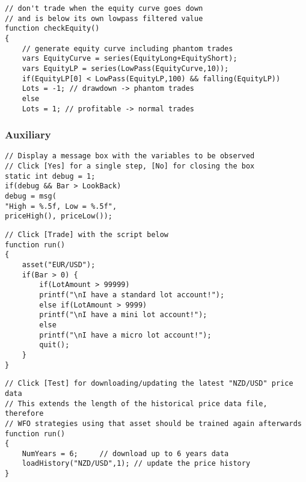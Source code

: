 \begin{lstlisting}[caption=Equity curve trading (skipping trades dependent on strategy success)]
// don't trade when the equity curve goes down
// and is below its own lowpass filtered value
function checkEquity()
{
	// generate equity curve including phantom trades
	vars EquityCurve = series(EquityLong+EquityShort);
	vars EquityLP = series(LowPass(EquityCurve,10));
	if(EquityLP[0] < LowPass(EquityLP,100) && falling(EquityLP))
	Lots = -1; // drawdown -> phantom trades
	else
	Lots = 1; // profitable -> normal trades
\end{lstlisting}

\subsubsection{Auxiliary}
\begin{lstlisting}[caption=Debugging a script]
// Display a message box with the variables to be observed
// Click [Yes] for a single step, [No] for closing the box
static int debug = 1;
if(debug && Bar > LookBack)
debug = msg(
"High = %.5f, Low = %.5f",
priceHigh(), priceLow());
\end{lstlisting}

\begin{lstlisting}[caption=Find out if you have a standard  mini  or micro lot account]
// Click [Trade] with the script below
function run()
{
	asset("EUR/USD");
	if(Bar > 0) {
		if(LotAmount > 99999) 
		printf("\nI have a standard lot account!");
		else if(LotAmount > 9999) 
		printf("\nI have a mini lot account!");
		else 
		printf("\nI have a micro lot account!");
		quit();
	}
}
\end{lstlisting}


\begin{lstlisting}[caption=Download historic price data]
// Click [Test] for downloading/updating the latest "NZD/USD" price data
// This extends the length of the historical price data file, therefore
// WFO strategies using that asset should be trained again afterwards
function run()
{
	NumYears = 6;     // download up to 6 years data 
	loadHistory("NZD/USD",1); // update the price history
}
\end{lstlisting}

